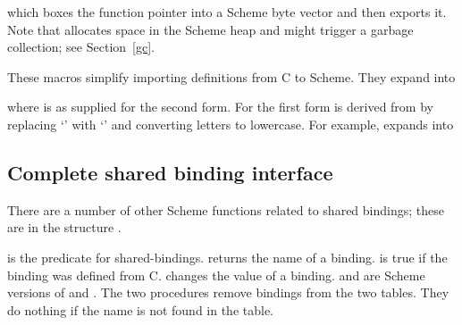 \noindent which boxes the function pointer into a Scheme byte vector and then
 exports it.
Note that  allocates space in the Scheme heap
 and might trigger a 
garbage collection; see Section~\ref{gc}.

\begin{protos}
\end{protos}
These macros simplify importing definitions from C to Scheme.
They expand into


\noindent{}where  is as supplied for the second form.
For the first form  is derived from  by
 replacing `\code{-}' with `\code{\_}' and converting letters to lowercase.
For example,  expands into


\subsection{Complete shared binding interface}
\label{more-shared-bindings}

There are a number of other Scheme functions related to shared bindings;
 these are in the structure .

\begin{protos}
\end{protos}

\noindent{} is the predicate for shared-bindings.
 returns the name of a binding.
 is true if the binding was defined from C.
 changes the value of a binding.
 and  are
 Scheme versions of 
 and .
The two  procedures remove bindings from the two tables.
They do nothing if the name is not found in the table.

